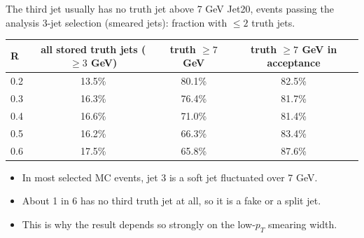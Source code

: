 \documentclass[aspectratio=169,10pt]{beamer}
\begin{document}
\begin{frame}{The third jet usually has no truth jet above 7 GeV}
  \small
  Jet20, events passing the analysis 3-jet selection (smeared jets):
  fraction with $\leq 2$ truth jets.
  \vspace{0.5em}

  \centering
  \begin{tabular}{lccc}
    \toprule
    R & all stored truth jets ($\geq 3$ GeV) & truth $\geq 7$ GeV & truth $\geq 7$ GeV in acceptance \\
    \midrule
    0.2 & 13.5\% & 80.1\% & 82.5\% \\
    0.3 & 16.3\% & 76.4\% & 81.7\% \\
    0.4 & 16.6\% & 71.0\% & 81.4\% \\
    0.5 & 16.2\% & 66.3\% & 83.4\% \\
    0.6 & 17.5\% & 65.8\% & 87.6\% \\
    \bottomrule
  \end{tabular}
  \vspace{0.8em}
  \begin{itemize}
    \item In most selected MC events, jet 3 is a soft jet fluctuated over 7 GeV.
    \item About 1 in 6 has no third truth jet at all, so it is a fake or a split jet.
    \item This is why the result depends so strongly on the low-$p_T$ smearing width.
  \end{itemize}
\end{frame}
\end{document}
